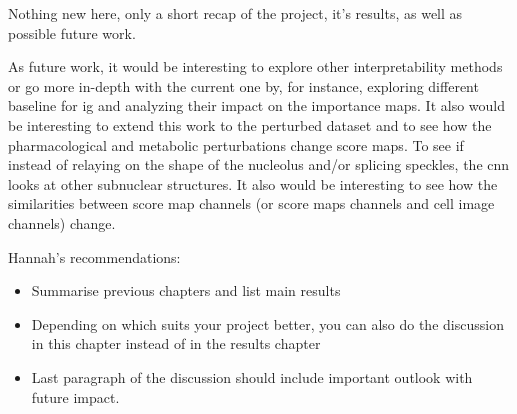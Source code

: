 
\glsresetall

Nothing new here, only a short recap of the project, it's results, as well as possible future work.

As future work, it would be interesting to explore other interpretability  methods or go more in-depth with the current one by, for instance, exploring different baseline for \acrlong{ig} and analyzing their impact on the importance maps.
It also would be interesting to extend this work to the perturbed dataset and to see how the pharmacological and metabolic perturbations change score maps. To see if instead of relaying on the shape of the nucleolus and/or splicing speckles, the \gls{cnn} looks at other subnuclear structures. It also would be interesting to see how the similarities between score map channels (or score maps channels and cell image channels) change.


Hannah's recommendations:
\begin{itemize}
  \item Summarise previous chapters and list main results
  \item Depending on which suits your project better, you can also do the discussion in this chapter instead of in the results chapter
  \item Last paragraph of the discussion should include important outlook with future impact.
\end{itemize}




